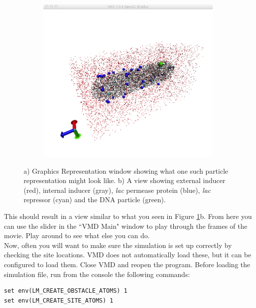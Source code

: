 \begin{figure}[h!]
\begin{subfigure}[b]{0.29\textwidth}
        \end{subfigure}
        \begin{subfigure}[b]{0.68\textwidth}
          \includegraphics[width=\textwidth]{Figures/PrettiedView.png}
        \end{subfigure}
        \caption{a) Graphics Representation window showing what one such particle representation might look like. b) A view showing external inducer (red), internal inducer (gray), {\it lac} permease protein (blue), {\it lac} repressor (cyan) and the DNA particle (green).} \label{fig:graphicR}
\end{figure}

This should result in a view similar to what you seen in Figure \ref{fig:graphicR}b.  From here you can use the slider in the ``VMD Main" window to play through the frames of the movie.  Play around to see what else you can do.  \\

Now, often you will want to make sure the simulation is set up correctly by checking the site locations. VMD does not automatically load these, but it can be configured to load them.  Close VMD and reopen the program.  Before loading the simulation file, run from the console the following commands:

\begin{verbatim}
set env(LM_CREATE_OBSTACLE_ATOMS) 1
set env(LM_CREATE_SITE_ATOMS) 1
\end{verbatim}

